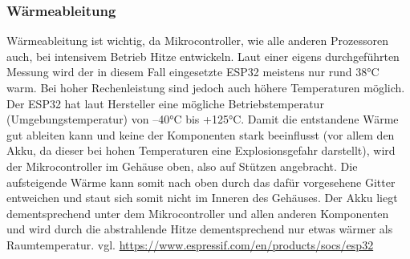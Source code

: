 \documentclass[11pt, twoside]{article}
\begin{document}
\subsubsection{Wärmeableitung}
Wärmeableitung ist wichtig, da Mikrocontroller, wie alle anderen Prozessoren auch, bei intensivem Betrieb Hitze entwickeln. Laut einer eigens durchgeführten Messung wird der in diesem Fall eingesetzte ESP32 meistens nur rund 38°C warm. Bei hoher Rechenleistung sind jedoch auch höhere Temperaturen möglich. Der ESP32 hat laut Hersteller eine mögliche Betriebstemperatur (Umgebungstemperatur) von –40°C bis +125°C. Damit die entstandene Wärme gut ableiten kann und keine der Komponenten stark beeinflusst (vor allem den Akku, da dieser bei hohen Temperaturen eine Explosionsgefahr darstellt), wird der Mikrocontroller im Gehäuse oben, also auf Stützen angebracht. Die aufsteigende Wärme kann somit nach oben durch das dafür vorgesehene Gitter entweichen und staut sich somit nicht im Inneren des Gehäuses. Der Akku liegt dementsprechend unter dem Mikrocontroller und allen anderen Komponenten und wird durch die abstrahlende Hitze dementsprechend nur etwas wärmer als Raumtemperatur.
\vspace{4mm}\newline
vgl. \url{https://www.espressif.com/en/products/socs/esp32}
\end{document}
